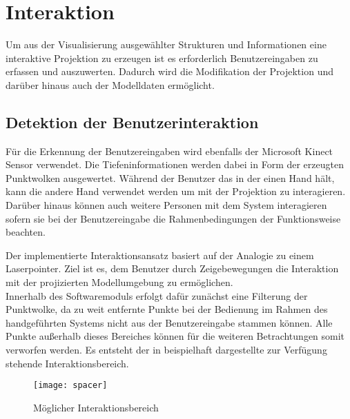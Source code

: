 \chapter{Interaktion}
Um aus der Visualisierung ausgewählter Strukturen und Informationen eine interaktive Projektion zu erzeugen ist es erforderlich Benutzereingaben zu erfassen und auszuwerten. Dadurch wird die Modifikation der Projektion und darüber hinaus auch der Modelldaten ermöglicht.

\section{Detektion der Benutzerinteraktion}
Für die Erkennung der Benutzereingaben wird ebenfalls der Microsoft Kinect Sensor verwendet. Die Tiefeninformationen werden dabei in Form der erzeugten Punktwolken ausgewertet. Während der Benutzer das \kps in der einen Hand hält, kann die andere Hand verwendet werden um mit der Projektion zu interagieren. 
Darüber hinaus können auch weitere Personen mit dem System interagieren sofern sie bei der Benutzereingabe die Rahmenbedingungen der Funktionsweise beachten.\\

Der implementierte Interaktionsansatz basiert auf der Analogie zu einem Laserpointer. Ziel ist es, dem Benutzer durch Zeigebewegungen die Interaktion mit der projizierten Modellumgebung zu ermöglichen.\\
Innerhalb des Softwaremoduls \mInteraction erfolgt dafür zunächst eine Filterung der Punktwolke, da zu weit entfernte Punkte bei der Bedienung im Rahmen des handgeführten Systems nicht aus der Benutzereingabe stammen können. Alle Punkte außerhalb dieses Bereiches können für die weiteren Betrachtungen somit verworfen werden. Es entsteht der in  beispielhaft dargestellte zur Verfügung stehende Interaktionsbereich.\\

\begin{figure}[!ht]
	\begin{center}
		\texttt{[image: spacer]}
		\caption{Möglicher Interaktionsbereich}
		\label{fig.intfov}
	\end{center}
\end{figure}

